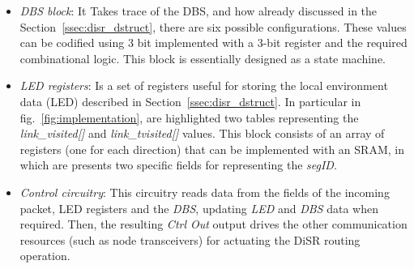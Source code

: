 \begin{itemize}
\item \emph{DBS block}: It Takes trace of the DBS, and how already
discussed in the Section~\ref{ssec:disr_dstruct}, there are six possible
configurations. These values can be codified using 3 bit implemented
with a 3-bit register and the required combinational logic. This block
is essentially designed as a state machine.
\item \emph{LED registers}: Is a set of registers useful for storing
the local environment data (LED) described in
Section~\ref{ssec:disr_dstruct}. In particular in
fig.~\ref{fig:implementation}, are highlighted two tables representing
the \emph{link\_visited[]} and \emph{link\_tvisited[]} values. This
block consists of an array of registers (one for each
direction) that can be implemented with an SRAM, in which are presents
two specific fields  for representing the \emph{segID}. 
\item \emph{Control circuitry}: This circuitry reads data
from the fields of the incoming packet, LED registers and the
\emph{DBS}, updating \emph{LED} and
\emph{DBS} data when required. Then, the resulting \emph{Ctrl Out} output  drives the other
communication resources (such as node transceivers) for actuating the
DiSR routing operation.
\end{itemize}

